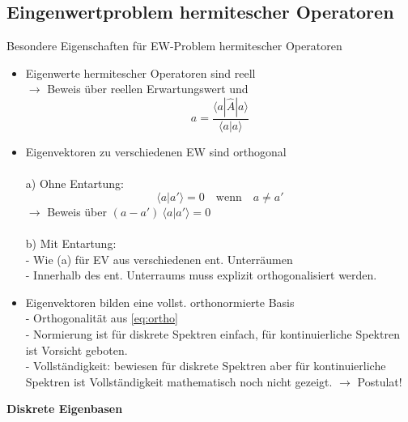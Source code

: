 \documentclass[10pt,article,colorback,accentcolor=tud9d]{scrartcl}
\begin{document}
\subsection{Eingenwertproblem hermitescher Operatoren}
Besondere Eigenschaften für EW-Problem hermitescher Operatoren
  \begin{itemize}
    \item Eigenwerte hermitescher Operatoren sind reell\\
      $\rightarrow$ Beweis über reellen Erwartungswert und 
      \begin{equation}
      a=\frac{\langle a\left.\right|\hat{A}\left.\right|a\rangle }{\langle a\left.\right|a\rangle }
      \end{equation}
    \item Eigenvektoren zu verschiedenen EW sind orthogonal\\ \\
      a) Ohne Entartung:
         \begin{equation}
        \label{eq:ortho}
          \langle a\left.\right|a'\rangle  = 0 \quad \text{wenn} \quad a \neq a'
          \end{equation}
          $\rightarrow$ Beweis über $(a-a') \ \langle a\left.\right|a'\rangle  = 0$\\ \\
      b) Mit Entartung:\\
         - Wie (a) für EV aus verschiedenen ent. Unterräumen\\
         - Innerhalb des ent. Unterraums muss explizit orthogonalisiert werden.
    \item Eigenvektoren bilden eine vollst. orthonormierte Basis\\
      - Orthogonalität aus \ref{eq:ortho}\\
      - Normierung ist für diskrete Spektren einfach, für kontinuierliche Spektren ist Vorsicht geboten.\\
      - Vollständigkeit: bewiesen für diskrete Spektren aber für kontinuierliche Spektren ist Vollständigkeit mathematisch noch nicht gezeigt. $\rightarrow$ Postulat!
  \end{itemize}
\textbf{Diskrete Eigenbasen}
\end{document}
